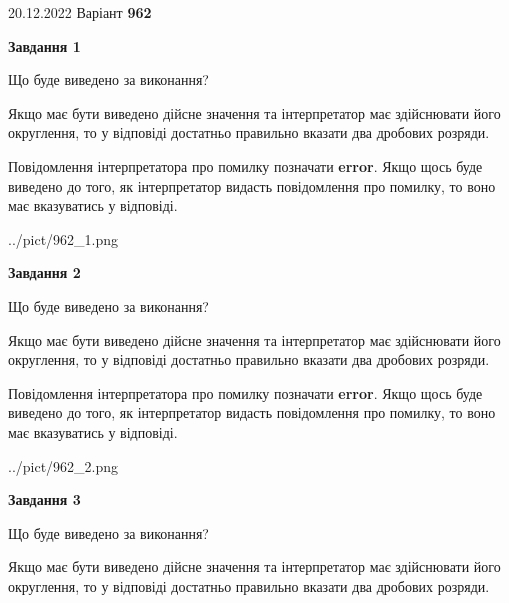 \documentclass[12pt, ukrainian]{article}
\begin{document}
{20.12.2022 Варіант \No \textbf { 962 }\par}
{
\begin {Large}

{\begin {center}\textbf{Завдання 1}\end {center}}\par
Що буде виведено за виконання? \par

Якщо має бути виведено дійсне значення та інтерпретатор має здійснювати його округлення, 
то у відповіді достатньо правильно вказати два дробових розряди.

Повідомлення інтерпретатора про помилку позначати \textbf{error}.
Якщо щось буде виведено до того, як інтерпретатор видасть повідомлення про помилку, 
то воно має вказуватись у відповіді. \par

\begin{center}
	{../pict/962_1.png}
\end{center}
\newpage

{\begin {center}\textbf{Завдання 2}\end {center}}\par
Що буде виведено за виконання? \par

Якщо має бути виведено дійсне значення та інтерпретатор має здійснювати його округлення, 
то у відповіді достатньо правильно вказати два дробових розряди.

Повідомлення інтерпретатора про помилку позначати \textbf{error}.
Якщо щось буде виведено до того, як інтерпретатор видасть повідомлення про помилку, 
то воно має вказуватись у відповіді. \par

\begin{center}
	{../pict/962_2.png}
\end{center}
\newpage

{\begin {center}\textbf{Завдання 3}\end {center}}\par
Що буде виведено за виконання? \par

Якщо має бути виведено дійсне значення та інтерпретатор має здійснювати його округлення, 
то у відповіді достатньо правильно вказати два дробових розряди.


\end{Large}}
\end{document}
